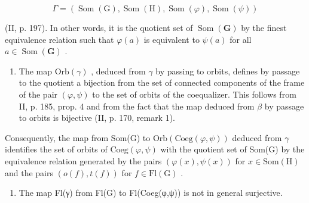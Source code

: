 \[
\Gamma = (\operatorname{Som} (\mathrm{G}), \operatorname{Som} (\mathrm{H}), \operatorname{Som} (\varphi), \operatorname{Som} (\psi))
\]

(II, p. 197). In other words, it is the quotient set of \(\operatorname{Som}(\mathbf{G})\) by the finest equivalence relation such that \(\varphi(a)\) is equivalent to \(\psi(a)\) for all \(a \in \operatorname{Som}(\mathbf{G})\) .

\begin{enumerate}
\def\labelenumi{\arabic{enumi})}
\setcounter{enumi}{1}
\tightlist
\item
  The map \(\mathrm{Orb}(\gamma)\) , deduced from \(\gamma\) by passing to orbits, defines by passage to the quotient a bijection from the set of connected components of the frame of the pair \((\varphi,\psi)\) to the set of orbits of the coequalizer. This follows from II, p. 185, prop. 4 and from the fact that the map deduced from \(\beta\) by passage to orbits is bijective (II, p. 170, remark 1).
\end{enumerate}

Consequently, the map from Som(G) to \(\mathrm{Orb}(\mathrm{Coeg}(\varphi,\psi))\) deduced from \(\gamma\) identifies the set of orbits of \(\mathrm{Coeg}(\varphi,\psi)\) with the quotient set of Som(G) by the equivalence relation generated by the pairs \((\varphi(x),\psi(x))\) for \(x\in\mathrm{Som(H)}\) and the pairs \((o(f),t(f))\) for \(f\in\mathrm{Fl(G)}\) .

\begin{enumerate}
\def\labelenumi{\arabic{enumi})}
\setcounter{enumi}{2}
\tightlist
\item
  The map Fl(γ) from Fl(G) to Fl(Coeg(φ,ψ)) is not in general surjective.
\end{enumerate}

